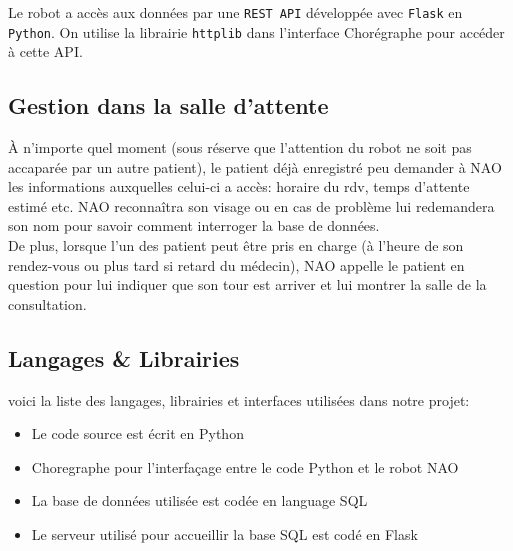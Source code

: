 \documentclass{article}
\begin{document}
Le robot a accès aux données par une \texttt{REST API} développée avec \texttt{Flask} en \texttt{Python}. On utilise la librairie \texttt{httplib} dans l'interface Chorégraphe pour accéder à cette API.


\subsection*{Gestion dans la salle d'attente}
À n'importe quel moment (sous réserve que l'attention du robot ne soit pas accaparée par un autre patient), le patient déjà enregistré peu demander à NAO les informations auxquelles celui-ci a accès: horaire du rdv, temps d'attente estimé etc. NAO reconnaîtra son visage ou en cas de problème lui redemandera son nom pour savoir comment interroger la base de données. \\
De plus, lorsque l'un des patient peut être pris en charge (à l'heure de son rendez-vous ou plus tard si retard du médecin), NAO appelle le patient en question pour lui indiquer que son tour est arriver et lui montrer la salle de la consultation.

\subsection{Langages & Librairies}
voici la liste des langages, librairies et interfaces utilisées dans notre projet:
\begin{itemize}
    \item Le code source est écrit en Python
    \item Choregraphe pour l'interfaçage entre le code Python et le robot NAO
    \item La base de données utilisée est codée en language SQL
    \item Le serveur utilisé pour accueillir la base SQL est codé en Flask
\end{itemize}
\end{document}
